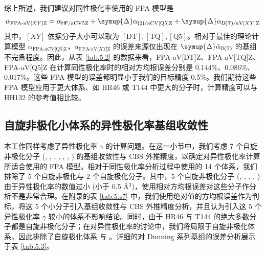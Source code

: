 综上所述，我们建议对同性极化率使用的 FPA 模型是
\begin{equation}
    \label{eq.5.fpa-alpha}
    \alpha_{\text{FPA-aV[}XY\text{]Z}} = \alpha_{\textsf{HF}/\text{aCV5Z}} + \symup{\Delta} \alpha_{\textsf{(2)}/\text{aCV[Q5]Z}} + \symup{\Delta} \alpha_{\textsf{D(T)}/\text{aV[}XY\text{]Z}}
\end{equation}
其中，$[XY]$ 依据分子大小可以取为 $\mathrm{[DT], [TQ], [Q5]}$。相对于最佳的理论计算模型 $\alpha_{\text{FPA-aCV[Q5]Z}}$，$\alpha_{\text{FPA-aV[}XY\text{]Z}}$ 的误差来源仅出现在 $\symup{\Delta} \tilde \alpha_\textsf{D(T)}$ 的基组不完备程度。因此，从表 \ref{tab.5.2} 的数据来看，FPA-aV[DT]Z、FPA-aV[TQ]Z、FPA-aV[Q5]Z 在计算同性极化率时的相对方均根误差分别是 0.144\%、0.086\%、0.017\%。这些 FPA 模型的误差都明显小于我们的目标精度 0.5\%。我们期待这些 FPA 模型应用于更大体系、如 HR46 或 T144 中更大的分子时，计算精度可以与 HH132 的参考值相比较。

\subsection{自旋非极化小体系的异性极化率基组收敛性}

本工作同样考虑了异性极化率 $\gamma$ 的计算问题。在这一小节中，我们考虑 7 个自旋非极化分子 (, , , , , , ) 的基组收敛性与 CBS 外推精度，以确定对异性极化率计算所适合使用的 FPA 模型。相对于同性极化率分析过程中使用的 14 个体系，我们排除了 5 个自旋非极化与 2 个自旋极化分子。其中，5 个自旋非极化分子 (, , , , ) 由于异性极化率的数值过小 (小于 0.5 $\text{\AA}{}^3$)，使用相对方均根误差对这些分子作分析不是非常合理。在附录的表 \ref{tab.5.s7} 中，我们使用绝对值的方均根误差作为判标，将这 5 个小分子引入基组收敛性与 CBS 外推精度分析，并且认为引入这 5 个异性极化率 $\gamma$ 较小的体系不影响结论。同时，由于 HR46 与 T144 的绝大多数分子都是自旋非极化分子；在对异性极化率的讨论中，我们将局限于自旋非极化体系，因此排除了自旋极化体系  与 。详细的对 Dunning 系列基组的误差分析展示于表 \ref{tab.5.3}。

